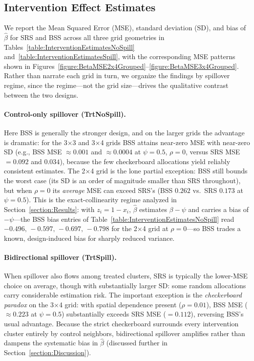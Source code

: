 \documentclass{article}[11pt]
\begin{document}
\subsection{Intervention Effect Estimates}

We report the Mean Squared Error (MSE), standard deviation (SD), and bias of $\hat{\beta}$ for SRS and BSS across all three grid geometries in Tables~\ref{table:InterventionEstimatesNoSpill} and~\ref{table:InterventionEstimatesSpill}, with the corresponding MSE patterns shown in Figures~\ref{figure:BetaMSE2x4Grouped}--\ref{figure:BetaMSE3x4Grouped}. Rather than narrate each grid in turn, we organize the findings by spillover regime, since the regime---not the grid size---drives the qualitative contrast between the two designs.

\paragraph{Control-only spillover (TrtNoSpill).} Here BSS is generally the stronger design, and on the larger grids the advantage is dramatic: for the 3$\times$3 and 3$\times$4 grids BSS attains near-zero MSE with near-zero SD (e.g., BSS MSE $\approx 0.001$ and $\approx 0.0004$ at $\psi = 0.5$, $\rho = 0$, versus SRS MSE $= 0.092$ and $0.034$), because the few checkerboard allocations yield reliably consistent estimates. The 2$\times$4 grid is the lone partial exception: BSS still bounds the worst case (its SD is an order of magnitude smaller than SRS throughout), but when $\rho = 0$ its \emph{average} MSE can exceed SRS's (BSS $0.262$ vs.\ SRS $0.173$ at $\psi = 0.5$). This is the exact-collinearity regime analyzed in Section~\ref{section:Results}: with $z_i = 1 - x_i$, $\hat{\beta}$ estimates $\beta - \psi$ and carries a bias of $-\psi$---the BSS bias entries of Table~\ref{table:InterventionEstimatesNoSpill} read $-0.496,\,-0.597,\,-0.697,\,-0.798$ for the 2$\times$4 grid at $\rho=0$---so BSS trades a known, design-induced bias for sharply reduced variance.

\paragraph{Bidirectional spillover (TrtSpill).} When spillover also flows among treated clusters, SRS is typically the lower-MSE choice on average, though with substantially larger SD: some random allocations carry considerable estimation risk. The important exception is the \emph{checkerboard paradox} on the 3$\times$4 grid: with spatial dependence present ($\rho = 0.01$), BSS MSE ($\approx 0.223$ at $\psi = 0.5$) substantially exceeds SRS MSE ($= 0.112$), reversing BSS's usual advantage. Because the strict checkerboard surrounds every intervention cluster entirely by control neighbors, bidirectional spillover amplifies rather than dampens the systematic bias in $\hat{\beta}$ (discussed further in Section~\ref{section:Discussion}).
\end{document}
